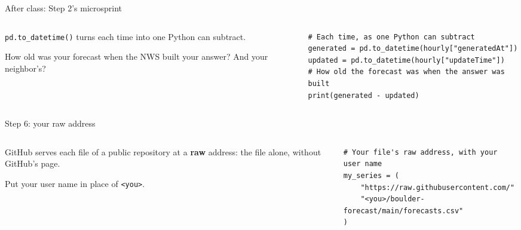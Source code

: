 \documentclass[9pt,aspectratio=169]{beamer}
\begin{document}
\begin{frame}[fragile]{After class: Step 2's microsprint}
    \begin{columns}[T]
        \begin{column}{0.37\textwidth}
            \texttt{pd.to\_datetime()} turns each time into one Python can subtract.

            \medskip
            How old was your forecast when the NWS built your answer? And your neighbor's?
        \end{column}
        \begin{column}{0.6\textwidth}
\begin{lstlisting}
# Each time, as one Python can subtract
generated = pd.to_datetime(hourly["generatedAt"])
updated = pd.to_datetime(hourly["updateTime"])
# How old the forecast was when the answer was built
print(generated - updated)
\end{lstlisting}
        \end{column}
    \end{columns}
\end{frame}

\begin{frame}[fragile]{Step 6: your raw address}
    \begin{columns}[T]
        \begin{column}{0.37\textwidth}
            GitHub serves each file of a public repository at a \textbf{raw} address: the file alone, without GitHub's page.

            \medskip
            Put your user name in place of \texttt{<you>}.
        \end{column}
        \begin{column}{0.6\textwidth}
\begin{lstlisting}
# Your file's raw address, with your user name
my_series = (
    "https://raw.githubusercontent.com/"
    "<you>/boulder-forecast/main/forecasts.csv"
)
\end{lstlisting}
        \end{column}
    \end{columns}
\end{frame}
\end{document}
